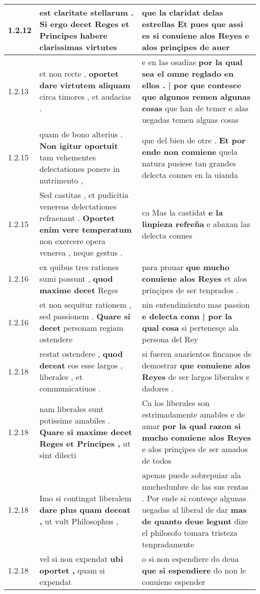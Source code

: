 \begin{tabular}{|p{1cm}|p{6.5cm}|p{6.5cm}|}
1.2.12 & est claritate stellarum . \textbf{ Si ergo decet Reges et Principes } habere clarissimas virtutes & que la claridat delas estrellas \textbf{ Et pues que assi es si conuiene alos Reyes } e alos prinçipes de auer \\\hline
1.2.13 & et non recte , \textbf{ oportet dare virtutem aliquam } circa timores , et audacias . & e en las osadias \textbf{ por la qual sea el omne reglado en ellos . | por que contesce que algunos remen algunas cosas } que han de temer e alas uegadas temen alguas cosas \\\hline
1.2.15 & quam de bono alterius . \textbf{ Non igitur oportuit } tam vehementes delectationes ponere in nutrimento , & que del bien de otre . \textbf{ Et por ende non conuiene } quela natura pusiese tan grandes delecta connes en la uianda \\\hline
1.2.15 & Sed castitas , et pudicitia venereas delectationes refraenant . \textbf{ Oportet enim vere temperatum } non exercere opera venerea , neque gestus . & ca Mas la castidat \textbf{ e la linpieza refreña } e abaxan las delecta connes \\\hline
1.2.16 & ex quibus tres rationes sumi possunt , \textbf{ quod maxime decet } Reges & para prouar \textbf{ que mucho conuiene alos Reyes } et alos prinçipes de ser tenprados . \\\hline
1.2.16 & et non sequitur rationem , sed passionem . \textbf{ Quare si decet } personam regiam ostendere & nin entendimiento mas passion \textbf{ e delecta conn | por la qual cosa } si pertenesçe ala persona del Rey \\\hline
1.2.18 & restat ostendere , \textbf{ quod deceat } eos esse largos , liberales , et communicatiuos . & si fueren auarientos fincanos de demostrar \textbf{ que conuiene alos Reyes } de ser largos liberales e dadores . \\\hline
1.2.18 & nam liberales sunt potissime amabiles . \textbf{ Quare si maxime decet Reges et Principes , } ut sint dilecti & Ca los liberales son estrimadamente amables e de amar \textbf{ por la qual razon si mucho conuiene alos Reyes } e alos prinçipes de ser amados de todos \\\hline
1.2.18 & Imo si contingat liberalem \textbf{ dare plus quam deceat , } ut vult Philosophus , & apenas puede sobrepuiar ala muchedunbre de las sus rentas . Por ende si contesçe algunas uegadas al liberal de dar \textbf{ mas de quanto deue legunt } dize el philosofo tomara tristeza tenpradamente \\\hline
1.2.18 & vel si non expendat \textbf{ ubi oportet , } quam si expendat & o si non espendiere do deua \textbf{ que si espendiere } do non le conuiene espender \\\hline

\end{tabular}
